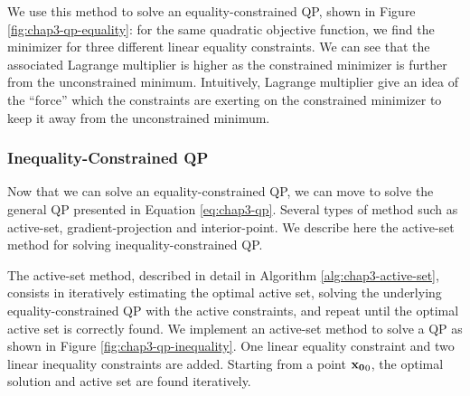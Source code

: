 We use this method to solve an equality-constrained QP, shown in
Figure \ref{fig:chap3-qp-equality}: for the same quadratic objective
function, we find the minimizer for three different linear equality
constraints. We can see that the associated Lagrange multiplier is
higher as the constrained minimizer is further from the unconstrained
minimum. Intuitively, Lagrange multiplier give an idea of the
``force'' which the constraints are exerting on the constrained
minimizer to keep it away from the unconstrained minimum.

\subsubsection{Inequality-Constrained QP}

Now that we can solve an equality-constrained QP, we can move to solve
the general QP presented in Equation \ref{eq:chap3-qp}. Several types
of method such as active-set, gradient-projection and
interior-point. We describe here the active-set method for solving
inequality-constrained QP.

The active-set method, described in detail in Algorithm
\ref{alg:chap3-active-set}, consists in iteratively estimating the
optimal active set, solving the underlying equality-constrained QP
with the active constraints, and repeat until the optimal active set
is correctly found. We implement an active-set method to solve a QP as
shown in Figure \ref{fig:chap3-qp-inequality}. One linear equality
constraint and two linear inequality constraints are added. Starting
from a point $\mathbf{x_0}_0$, the optimal solution and active set are
found iteratively.

